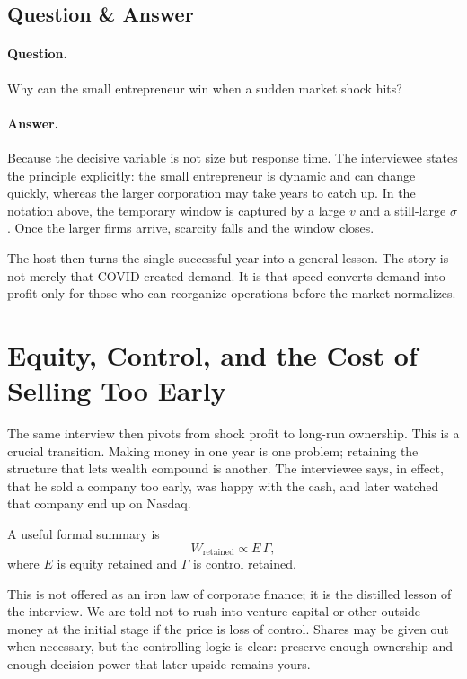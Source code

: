 \subsection{Question \& Answer}

\paragraph{Question.} Why can the small entrepreneur win when a sudden market shock hits?

\paragraph{Answer.} Because the decisive variable is not size but response time. The interviewee states the principle explicitly: the small entrepreneur is dynamic and can change quickly, whereas the larger corporation may take years to catch up. In the notation above, the temporary window is captured by a large \(v\) and a still-large \(\sigma\). Once the larger firms arrive, scarcity falls and the window closes.

The host then turns the single successful year into a general lesson. The story is not merely that COVID created demand. It is that speed converts demand into profit only for those who can reorganize operations before the market normalizes.

\section{Equity, Control, and the Cost of Selling Too Early}

The same interview then pivots from shock profit to long-run ownership. This is a crucial transition. Making money in one year is one problem; retaining the structure that lets wealth compound is another. The interviewee says, in effect, that he sold a company too early, was happy with the cash, and later watched that company end up on Nasdaq.

A useful formal summary is
\begin{equation}
W_{\mathrm{retained}} \propto E\,\Gamma,
\end{equation}
where \(E\) is equity retained and \(\Gamma\) is control retained.

This is not offered as an iron law of corporate finance; it is the distilled lesson of the interview. We are told not to rush into venture capital or other outside money at the initial stage if the price is loss of control. Shares may be given out when necessary, but the controlling logic is clear: preserve enough ownership and enough decision power that later upside remains yours.

